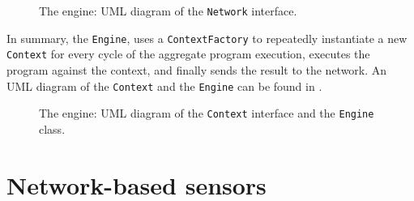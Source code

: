 \begin{figure}
    \centering
    \caption{The engine: \ac{UML} diagram of the \texttt{Network} interface.}
    \label{fig:engine-network-diagram}
    \bigskip
    \resizebox{\linewidth}{!}{
        
    }
\end{figure}

In summary, the \texttt{Engine}, uses a \texttt{ContextFactory} to repeatedly instantiate a new \texttt{Context} for every cycle of the aggregate program execution, executes the program against the context, and finally sends the result to the network.
%
An \ac{UML} diagram of the \texttt{Context} and the \texttt{Engine} can be found in .

\begin{figure}
    \centering
    \caption{The engine: \ac{UML} diagram of the \texttt{Context} interface and the \texttt{Engine} class.}
    \label{fig:engine-diagram}
    \bigskip
    \resizebox{\linewidth}{!}{
        
    }
\end{figure}


\section{Network-based sensors} \label{chap:design->sec:network-based-sensors}

